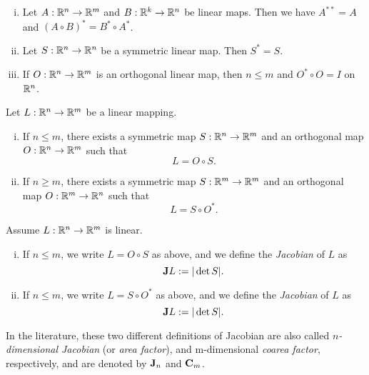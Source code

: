 \begin{proposition} \label{prop:properties_linear} \hfill
\begin{enumerate}[i)]
\item Let $A: \mathbb{R}^{n} \to \mathbb{R}^{m}$ and $B: \mathbb{R}^{k} \to \mathbb{R}^{n}$ be linear maps. Then we have $A^{**} = A$ and $(A \circ B)^{*} = B^{*} \circ A^{*}$.
\item Let $S : \mathbb{R}^{n} \to \mathbb{R}^{n}$ be a symmetric linear map. Then $S^{*} = S$.
\item If $O : \mathbb{R}^{n} \to \mathbb{R}^{m}$ is an orthogonal linear map, then $n \le m$ and $O^{*} \circ O = I$ on $\mathbb{R}^{n}$. 
\end{enumerate}
\end{proposition}

\begin{theorem} \label{thm:polar_decomposition_map}
Let $L: \mathbb{R}^{n} \to \mathbb{R}^{m}$ be a linear mapping.
\begin{enumerate}[i)]
\item If $n \le m$, there exists a symmetric map $S: \mathbb{R}^{n} \to \mathbb{R}^{m}$ and an orthogonal map $O: \mathbb{R}^{n} \to \mathbb{R}^{m}$ such that $$L = O \circ S.$$
\item If $n \ge m$, there exists a symmetric map $S: \mathbb{R}^{m} \to \mathbb{R}^{m}$ and an orthogonal map $O: \mathbb{R}^{m} \to \mathbb{R}^{n}$ such that $$L = S \circ O^{*}.$$
\end{enumerate}
\end{theorem}

\begin{definition}[Jacobian]
Assume $L : \mathbb{R}^{n} \to \mathbb{R}^{m}$ is linear.
\begin{enumerate}[i)]
\item If $n \le m$, we write $L = O \circ S$ as above, and we define the {\em Jacobian} of $L$ as $${\bf J} L := |\det{S}|.$$ 
\item If $n \le m$, we write $L = S \circ O^{*}$ as above, and we define the {\em Jacobian} of $L$ as $${\bf J} L := |\det{S}|.$$ 
\end{enumerate}
\end{definition}

In the literature, these two different definitions of Jacobian are also called {\em $n$-dimensional Jacobian} (or {\em area factor}), and {m}-dimensional {\em coarea factor}, respectively, and are denoted by ${\bf J}_{n}$ and ${\bf C}_{m}$.

